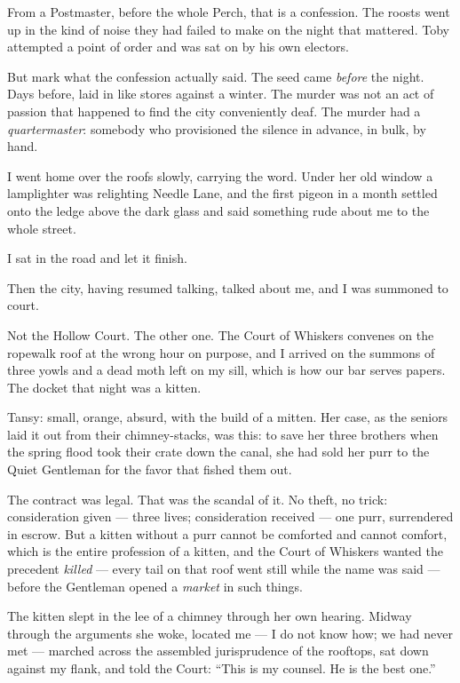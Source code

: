 From a Postmaster, before the whole Perch, that is a confession. The roosts went up in the kind of noise they had failed to make on the night that mattered. Toby attempted a point of order and was sat on by his own electors.

But mark what the confession actually said. The seed came \emph{before} the night. Days before, laid in like stores against a winter. The murder was not an act of passion that happened to find the city conveniently deaf. The murder had a \emph{quartermaster}: somebody who provisioned the silence in advance, in bulk, by hand.

I went home over the roofs slowly, carrying the word. Under her old window a lamplighter was relighting Needle Lane, and the first pigeon in a month settled onto the ledge above the dark glass and said something rude about me to the whole street.

I sat in the road and let it finish.

\scenebreak

Then the city, having resumed talking, talked about me, and I was summoned to court.

Not the Hollow Court. The other one. The Court of Whiskers convenes on the ropewalk roof at the wrong hour on purpose, and I arrived on the summons of three yowls and a dead moth left on my sill, which is how our bar serves papers. The docket that night was a kitten.

Tansy: small, orange, absurd, with the build of a mitten. Her case, as the seniors laid it out from their chimney-stacks, was this: to save her three brothers when the spring flood took their crate down the canal, she had sold her purr to the Quiet Gentleman for the favor that fished them out.

The contract was legal. That was the scandal of it. No theft, no trick: consideration given --- three lives; consideration received --- one purr, surrendered in escrow. But a kitten without a purr cannot be comforted and cannot comfort, which is the entire profession of a kitten, and the Court of Whiskers wanted the precedent \emph{killed} --- every tail on that roof went still while the name was said --- before the Gentleman opened a \emph{market} in such things.

The kitten slept in the lee of a chimney through her own hearing. Midway through the arguments she woke, located me --- I do not know how; we had never met --- marched across the assembled jurisprudence of the rooftops, sat down against my flank, and told the Court: ``This is my counsel. He is the best one.''

